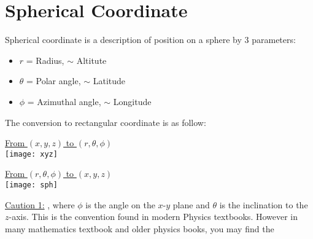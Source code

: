 \documentclass[class=article, crop=false, 12pt]{standalone}
\begin{document}
\linesep
\newpage
\section{Spherical Coordinate}

Spherical coordinate is a description of position on a sphere by 3 parameters:
\begin{itemize}
    \item $r$ = Radius, $\sim$ Altitute
    \item $\theta$ = Polar angle, $\sim$ Latitude
    \item $\phi$ = Azimuthal angle, $\sim$ Longitude
\end{itemize}

The conversion to rectangular coordinate is as follow:

\begin{center}
    \begin{minipage}[t]{0.4\textwidth}
        \centering
        \ul{From $(x,y,z)$ to $(r,\theta,\phi)$}
        \\[1em]
        \texttt{[image: xyz]}
        \\[-2em]
    \end{minipage}
    \begin{minipage}[t]{0.4\textwidth}
        \centering
        \ul{From $(r,\theta, \phi)$ to $(x,y,z)$}
        \\[1em]
        \texttt{[image: sph]}
        \\[-2em]
    \end{minipage}
\end{center}



\ul{Caution 1:} , 
where $\phi$ is the angle on the $x$-$y$ plane and $\theta$ is the inclination to the $z$-axis.
This is the convention found in modern Physics textbooks. 
However in many mathematics textbook and older physics books, 
you may find the \\
\end{document}
